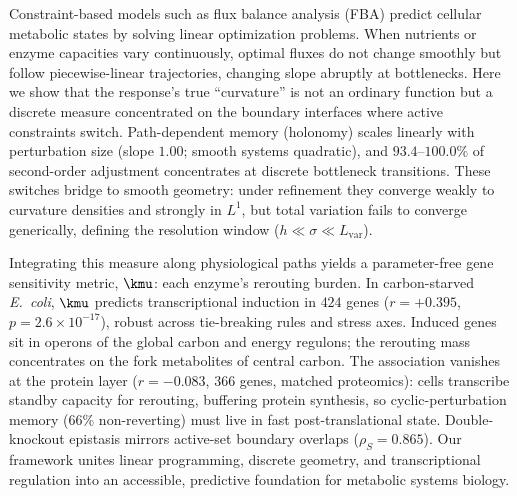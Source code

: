 Constraint-based models such as flux balance analysis (FBA) predict cellular
metabolic states by solving linear optimization problems. When
nutrients or enzyme capacities vary continuously, optimal fluxes do
not change smoothly but follow piecewise-linear trajectories, changing slope
abruptly at bottlenecks. Here we show that the response's true
``curvature'' is not an ordinary function but a
discrete measure concentrated on the boundary interfaces where active
constraints switch. Path-dependent memory (holonomy) scales linearly with
perturbation size (slope $1.00$; smooth systems quadratic), and
$93.4$--$100.0\%$ of second-order adjustment concentrates at discrete
bottleneck transitions. These switches bridge to smooth
geometry: under refinement they converge weakly to
curvature densities and strongly in $L^1$, but total variation
fails to converge generically, defining the resolution window ($h \ll
\sigma \ll L_{\mathrm{var}}$).

Integrating this measure along physiological paths yields a
parameter-free gene sensitivity metric, $\kmu$: each enzyme's
rerouting burden. In carbon-starved \emph{E.~coli}, $\kmu$
predicts transcriptional induction in $424$ genes
($r = +0.395$, $p = 2.6 \times 10^{-17}$),
robust across tie-breaking rules and stress axes. Induced
genes sit in operons of the global carbon and energy regulons;
the rerouting mass concentrates on the fork metabolites of
central carbon. The association vanishes at the protein layer
($r = -0.083$, $366$ genes, matched proteomics):
cells transcribe standby capacity for rerouting, buffering protein
synthesis, so cyclic-perturbation memory ($66\%$ non-reverting)
must live in fast post-translational state.
Double-knockout epistasis mirrors active-set boundary overlaps
($\rho_S = 0.865$). Our framework unites linear programming,
discrete geometry, and transcriptional regulation into an
accessible, predictive foundation for metabolic systems biology.
